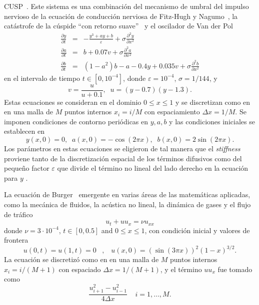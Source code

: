 \begin{example}
    \label{ex:cusp} CUSP~\cite{wanner1996solving,tokman2006efficient}. Este sistema es una combinación del mecanismo de umbral del impulso nervioso de la ecuación de conducción nerviosa de Fitz-Hugh y Nagumo~\cite{fitzhugh1969mathematical,nagumo1962active}, la catástrofe de la cúspide ``con retorno suave''~\cite{zeeman1973differential} y el oscilador de Van  der Pol
    \begin{eqnarray*}
        \frac{\partial y}{\partial t} &=& -\frac{y^{3}+ay+b}{\varepsilon}+\sigma\frac{\partial^{2}y}{\partial x^{2}}\\
        \frac{\partial a}{\partial t} &=& b+0\mathord{.}07v+\sigma \frac{\partial^{2}a}{\partial x^{2}}\\
        \frac{\partial b}{\partial t} &=& (1-a^{2})b-a-0\mathord{.}4y+0\mathord{.}035v+\sigma\frac{\partial^{2}b}{\partial x^{2}}
    \end{eqnarray*}
    en el intervalo de tiempo $t\in [0,10^{-4}]$, donde $\varepsilon=10^{-4}$, $\sigma=1/144$, y
    \[ v= \frac{u}{u+0\mathord{.}1},\;\; u=(y-0\mathord{.}7)(y-1\mathord{.}3).\]
    Estas ecuaciones se consideran en el dominio $0\leq x\leq 1$ y se discretizan como en \cite{tokman2006efficient} en una malla de $M$ puntos internos $x_i = i/M$ con espaciamiento $\Delta x=1/M$. Se imponen condiciones de contorno periódicas en $y,a,b$ y las condiciones iniciales se establecen en
    \[y(x, 0)=0,\;\;a(x, 0)=-\cos(2\pi x),\;\;b(x, 0)=2\sin(2\pi x).\]
    Los parámetros en estas ecuaciones se eligieron de tal manera que el \textit{stiffness} proviene tanto de la discretización espacial de los términos difusivos como del pequeño factor $\varepsilon$ que divide el término no lineal del lado derecho en la ecuación para $y$ .
\end{example}

\begin{example}\label{ex:Burger}
     La ecuación de Burger~\cite{tokman2006efficient} emergente en varias áreas de las matemáticas aplicadas, como la mecánica de fluidos, la acústica no lineal, la dinámica de gases y el flujo de tráfico
    \[ u_t+uu_x=\nu u_{xx} \]
    donde $\nu = 3\cdot10^{-4}$, $t\in [0,0\mathord{.}5]$ and $0\leq x\leq 1$, con condición inicial y valores de frontera
    \begin{equation*}
    u(0,t)=u(1,t)=0 \;\;\; ,   \;\;\;  u(x,0)=(\sin(3\pi x))^{2}(1-x)^{3/2}.
    \end{equation*}
    La ecuación se discretizó como en \cite{tokman2006efficient} en una malla de $M$ puntos internos $x_i = i/(M+1)$ con espaciado $\Delta x=1/(M+1)$, y el término $uu_x$ fue tomado como
    \[ \frac{u_{i+1}^{2}-u_{i-1}^{2}}{4\Delta x} \;\;\;\;  i=1,\ldots,M.\]
\end{example}

